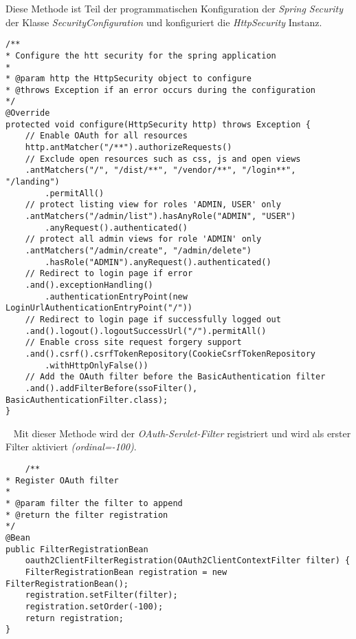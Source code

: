 Diese Methode ist Teil der programmatischen Konfiguration der \emph{Spring Security} der Klasse \emph{SecurityConfiguration} und konfiguriert die \emph{HttpSecurity} Instanz.
\begin{verbatim}
/**
* Configure the htt security for the spring application
*
* @param http the HttpSecurity object to configure
* @throws Exception if an error occurs during the configuration
*/
@Override
protected void configure(HttpSecurity http) throws Exception {
	// Enable OAuth for all resources
	http.antMatcher("/**").authorizeRequests()
	// Exclude open resources such as css, js and open views
	.antMatchers("/", "/dist/**", "/vendor/**", "/login**", "/landing")
		.permitAll()
	// protect listing view for roles 'ADMIN, USER' only
	.antMatchers("/admin/list").hasAnyRole("ADMIN", "USER")
		.anyRequest().authenticated()
	// protect all admin views for role 'ADMIN' only
	.antMatchers("/admin/create", "/admin/delete")
		.hasRole("ADMIN").anyRequest().authenticated()
	// Redirect to login page if error
	.and().exceptionHandling()
		.authenticationEntryPoint(new LoginUrlAuthenticationEntryPoint("/"))
	// Redirect to login page if successfully logged out
	.and().logout().logoutSuccessUrl("/").permitAll()
	// Enable cross site request forgery support
	.and().csrf().csrfTokenRepository(CookieCsrfTokenRepository
		.withHttpOnlyFalse())
	// Add the OAuth filter before the BasicAuthentication filter
	.and().addFilterBefore(ssoFilter(), BasicAuthenticationFilter.class);
}
\end{verbatim}
\ \newline
Mit dieser Methode wird der \emph{OAuth-Servlet-Filter} registriert und wird als erster Filter aktiviert \emph{(ordinal=-100)}.
\begin{verbatim}
    /**
* Register OAuth filter
*
* @param filter the filter to append
* @return the filter registration
*/
@Bean
public FilterRegistrationBean 
	oauth2ClientFilterRegistration(OAuth2ClientContextFilter filter) {
	FilterRegistrationBean registration = new FilterRegistrationBean();
	registration.setFilter(filter);
	registration.setOrder(-100);
	return registration;
}
\end{verbatim}
\ \newpage

